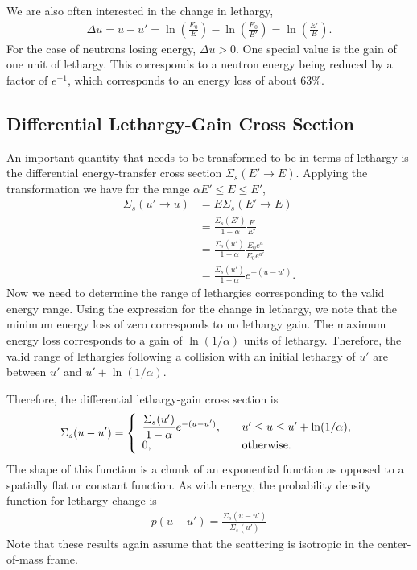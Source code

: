 We are also often interested in the change in lethargy,
\begin{align}
  \Delta u = u - u' = \ln\left( \frac{E_0}{E} \right) - \ln\left( \frac{E_0}{E'} \right) = \ln\left( \frac{E'}{E} \right) .
\end{align}
For the case of neutrons losing energy, $\Delta u > 0$. One special value is the gain of one unit of lethargy. This corresponds to a neutron energy being reduced by a factor of $e^{-1}$, which corresponds to an energy loss of about 63\%.

\subsection{Differential Lethargy-Gain Cross Section}

An important quantity that needs to be transformed to be in terms of lethargy is the differential energy-transfer cross section $\Sigma_s(E' \rightarrow E)$. Applying the transformation we have for the range $\alpha E' \le E \le E'$,
\begin{align}
  \Sigma_s(u' \rightarrow u) 
  &= E \Sigma_s( E' \rightarrow E ) \nonumber \\
  &= \frac{\Sigma_s(E')}{1 - \alpha} \frac{E}{E'}  \nonumber \\
  &= \frac{\Sigma_s(u')}{1 - \alpha} \frac{E_0 e^u}{E_0 e^{u'}} \nonumber \\
  &= \frac{\Sigma_s(u')}{1 - \alpha} e^{-(u - u')} .
\end{align}
Now we need to determine the range of lethargies corresponding to the valid energy range. Using the expression for the change in lethargy, we note that the minimum energy loss of zero corresponds to no lethargy gain. The maximum energy loss corresponds to a gain of $\ln(1/\alpha)$ units of lethargy. Therefore, the valid range of lethargies following a collision with an initial lethargy of $u'$ are between $u'$ and $u'+ \ln(1/\alpha)$.

Therefore, the differential lethargy-gain cross section is
\begin{align}
  \Sigma_s(u - u') = \left\{ \begin{array}{l l}
  \dfrac{\Sigma_s(u')}{1 - \alpha} e^{-(u - u')} , 	& \quad u' \le u \le u' + \ln(1/\alpha), \\
  0,												& \quad \text{otherwise}. \\ \end{array} \right.
\end{align}
The shape of this function is a chunk of an exponential function as opposed to a spatially flat or constant function. As with energy, the probability density function for lethargy change is
\begin{align}
  p(u - u') = \frac{ \Sigma_s(u - u') }{ \Sigma_s(u') }
\end{align}
Note that these results again assume that the scattering is isotropic in the center-of-mass frame.

